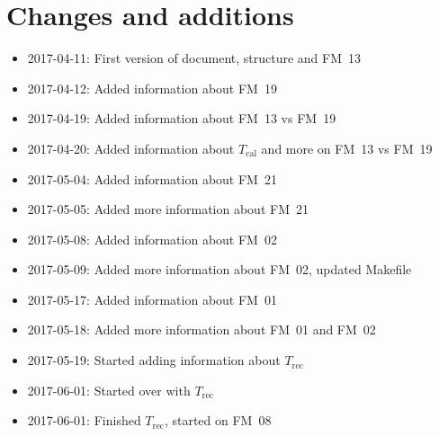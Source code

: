 \chapter{Changes and additions}
\label{ch:changes}

\begin{itemize}
    \item 2017-04-11: First version of document, structure and FM~13
    \item 2017-04-12: Added information about FM~19
    \item 2017-04-19: Added information about FM~13 vs FM~19
    \item 2017-04-20: Added information about $T_\mathrm{cal}$
                      and more on FM~13 vs FM~19
    \item 2017-05-04: Added information about FM~21
    \item 2017-05-05: Added more information about FM~21
    \item 2017-05-08: Added information about FM~02
    \item 2017-05-09: Added more information about FM~02, updated Makefile
    \item 2017-05-17: Added information about FM~01
    \item 2017-05-18: Added more information about FM~01 and FM~02
    \item 2017-05-19: Started adding information about $T_\mathrm{rec}$
    \item 2017-06-01: Started over with $T_\mathrm{rec}$
    \item 2017-06-01: Finished $T_\mathrm{rec}$, started on FM~08
\end{itemize}
